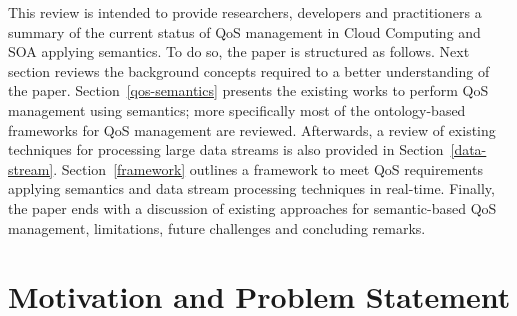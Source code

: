 This review is intended to provide researchers, developers and practitioners a summary of the current status of QoS management in Cloud Computing and SOA applying semantics. To do so, the paper 
is structured as follows. Next section reviews the background concepts required to a better understanding of the paper. Section~\ref{qos-semantics} 
presents the existing works to perform QoS management using semantics; more specifically most of the ontology-based frameworks for 
QoS management are reviewed. Afterwards, a review of existing techniques for processing large data streams is also provided in Section~\ref{data-stream}. 
Section~\ref{framework} outlines a framework to meet QoS requirements applying semantics and data stream processing techniques in real-time. 
Finally, the paper ends with a discussion of existing approaches for semantic-based QoS management, 
limitations, future challenges and concluding remarks. 

\section{Motivation and Problem Statement}
